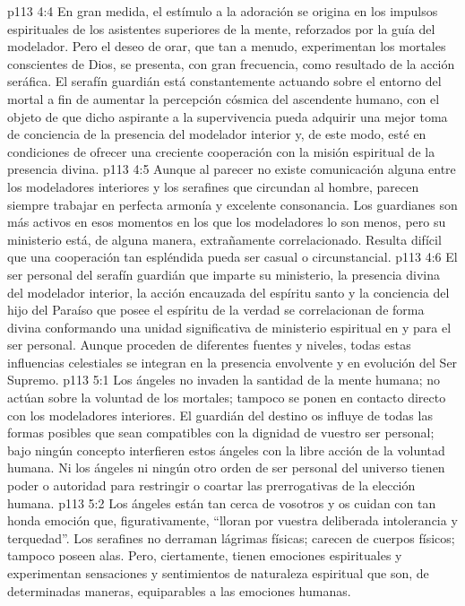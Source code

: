 \vs p113 4:4 En gran medida, el estímulo a la adoración se origina en los impulsos espirituales de los asistentes superiores de la mente, reforzados por la guía del modelador. Pero el deseo de orar, que tan a menudo, experimentan los mortales conscientes de Dios, se presenta, con gran frecuencia, como resultado de la acción seráfica. El serafín guardián está constantemente actuando sobre el entorno del mortal a fin de aumentar la percepción cósmica del ascendente humano, con el objeto de que dicho aspirante a la supervivencia pueda adquirir una mejor toma de conciencia de la presencia del modelador interior y, de este modo, esté en condiciones de ofrecer una creciente cooperación con la misión espiritual de la presencia divina.
\vs p113 4:5 Aunque al parecer no existe comunicación alguna entre los modeladores interiores y los serafines que circundan al hombre, parecen siempre trabajar en perfecta armonía y excelente consonancia. Los guardianes son más activos en esos momentos en los que los modeladores lo son menos, pero su ministerio está, de alguna manera, extrañamente correlacionado. Resulta difícil que una cooperación tan espléndida pueda ser casual o circunstancial.
\vs p113 4:6 El ser personal del serafín guardián que imparte su ministerio, la presencia divina del modelador interior, la acción encauzada del espíritu santo y la conciencia del hijo del Paraíso que posee el espíritu de la verdad se correlacionan de forma divina conformando una unidad significativa de ministerio espiritual en y para el ser personal. Aunque proceden de diferentes fuentes y niveles, todas estas influencias celestiales se integran en la presencia envolvente y en evolución del Ser Supremo.
\vs p113 5:1 Los ángeles no invaden la santidad de la mente humana; no actúan sobre la voluntad de los mortales; tampoco se ponen en contacto directo con los modeladores interiores. El guardián del destino os influye de todas las formas posibles que sean compatibles con la dignidad de vuestro ser personal; bajo ningún concepto interfieren estos ángeles con la libre acción de la voluntad humana. Ni los ángeles ni ningún otro orden de ser personal del universo tienen poder o autoridad para restringir o coartar las prerrogativas de la elección humana.
\vs p113 5:2 Los ángeles están tan cerca de vosotros y os cuidan con tan honda emoción que, figurativamente, “lloran por vuestra deliberada intolerancia y terquedad”. Los serafines no derraman lágrimas físicas; carecen de cuerpos físicos; tampoco poseen alas. Pero, ciertamente, tienen emociones espirituales y experimentan sensaciones y sentimientos de naturaleza espiritual que son, de determinadas maneras, equiparables a las emociones humanas.
